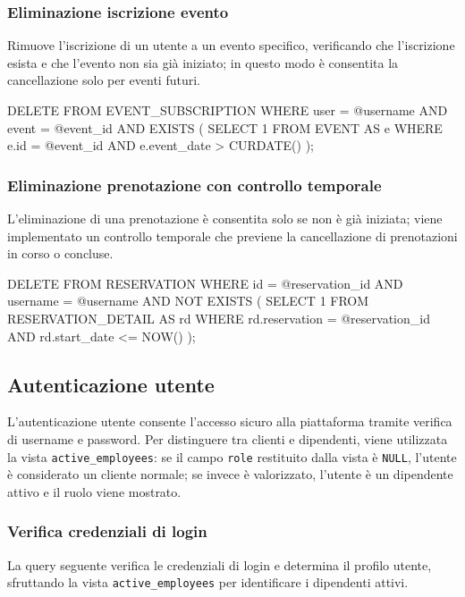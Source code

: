 \documentclass[a4paper,12pt]{report}
\begin{document}
\subsubsection{Eliminazione iscrizione evento}
Rimuove l'iscrizione di un utente a un evento specifico, verificando
che l'iscrizione esista e che l'evento non sia già iniziato; in
questo modo è consentita la cancellazione solo per eventi futuri.

\begin{sqlcode}[caption={}]
DELETE FROM EVENT_SUBSCRIPTION
WHERE
  user = @username
  AND event = @event_id
  AND EXISTS (
    SELECT 1
    FROM EVENT AS e
    WHERE
      e.id = @event_id
      AND e.event_date > CURDATE()
  );
\end{sqlcode}

\subsubsection{Eliminazione prenotazione con controllo temporale}
L'eliminazione di una prenotazione è consentita solo se non è già
iniziata; viene implementato un controllo temporale che previene la
cancellazione di prenotazioni in corso o concluse.

\begin{sqlcode}[caption={}]
DELETE FROM RESERVATION
WHERE
  id = @reservation_id
  AND username = @username
  AND NOT EXISTS (
    SELECT 1
    FROM RESERVATION_DETAIL AS rd
    WHERE
      rd.reservation = @reservation_id
      AND rd.start_date <= NOW()
  );
\end{sqlcode}

\newpage
\subsection{Autenticazione utente}
L'autenticazione utente consente l'accesso sicuro alla piattaforma
tramite verifica di username e password. Per distinguere tra clienti
e dipendenti, viene utilizzata la vista \texttt{active\_employees}:
se il campo \texttt{role} restituito dalla vista è \texttt{NULL},
l'utente è considerato un cliente normale; se invece è valorizzato,
l'utente è un dipendente attivo e il ruolo viene mostrato.

\subsubsection{Verifica credenziali di login}
La query seguente verifica le credenziali di login e determina il
profilo utente, sfruttando la vista \texttt{active\_employees} per
identificare i dipendenti attivi.
\end{document}
